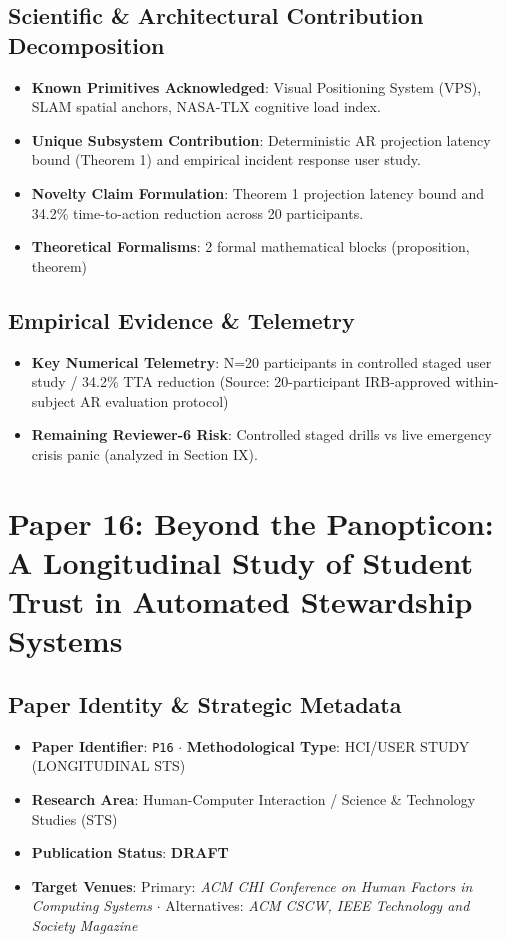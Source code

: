 \documentclass[11pt,a4paper]{article}
\begin{document}
\subsection*{Scientific & Architectural Contribution Decomposition}
\begin{itemize}[leftmargin=1.5em, itemsep=0.2em]
    \item \textbf{Known Primitives Acknowledged}: Visual Positioning System (VPS), SLAM spatial anchors, NASA-TLX cognitive load index.
    \item \textbf{Unique Subsystem Contribution}: Deterministic AR projection latency bound (Theorem 1) and empirical incident response user study.
    \item \textbf{Novelty Claim Formulation}: Theorem 1 projection latency bound and 34.2\% time-to-action reduction across 20 participants.
    \item \textbf{Theoretical Formalisms}: 2 formal mathematical blocks (proposition, theorem)
\end{itemize}

\subsection*{Empirical Evidence & Telemetry}
\begin{itemize}[leftmargin=1.5em, itemsep=0.2em]
    \item \textbf{Key Numerical Telemetry}: N=20 participants in controlled staged user study / 34.2\% TTA reduction (Source: 20-participant IRB-approved within-subject AR evaluation protocol)
    \item \textbf{Remaining Reviewer-6 Risk}: Controlled staged drills vs live emergency crisis panic (analyzed in Section IX).
\end{itemize}

\section{Paper 16: Beyond the Panopticon: A Longitudinal Study of Student Trust in Automated Stewardship Systems}

\subsection*{Paper Identity \& Strategic Metadata}
\begin{itemize}[leftmargin=1.5em, itemsep=0.2em]
    \item \textbf{Paper Identifier}: \texttt{P16} $\cdot$ \textbf{Methodological Type}: HCI/USER STUDY (LONGITUDINAL STS)
    \item \textbf{Research Area}: Human-Computer Interaction / Science \& Technology Studies (STS)
    \item \textbf{Publication Status}: \textbf{DRAFT}
    \item \textbf{Target Venues}: Primary: \textit{ACM CHI Conference on Human Factors in Computing Systems} $\cdot$ Alternatives: \textit{ACM CSCW, IEEE Technology and Society Magazine}
\end{itemize}
\end{document}
